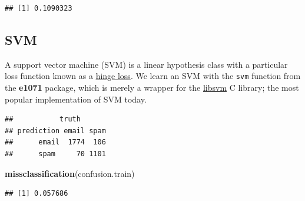 \documentclass[]{book}
\newenvironment{Shaded}{\begin{snugshade}}{\end{snugshade}}
\newcommand{\KeywordTok}[1]{\textcolor[rgb]{0.13,0.29,0.53}{\textbf{#1}}}
\newcommand{\DataTypeTok}[1]{\textcolor[rgb]{0.13,0.29,0.53}{#1}}
\newcommand{\DecValTok}[1]{\textcolor[rgb]{0.00,0.00,0.81}{#1}}
\newcommand{\StringTok}[1]{\textcolor[rgb]{0.31,0.60,0.02}{#1}}
\newcommand{\CommentTok}[1]{\textcolor[rgb]{0.56,0.35,0.01}{\textit{#1}}}
\newcommand{\OperatorTok}[1]{\textcolor[rgb]{0.81,0.36,0.00}{\textbf{#1}}}
\newcommand{\NormalTok}[1]{#1}
\theoremstyle{definition}
\theoremstyle{definition}
\theoremstyle{definition}
\theoremstyle{remark}
\begin{document}
\begin{verbatim}
## [1] 0.1090323
\end{verbatim}

\subsection{SVM}\label{svm}

A support vector machine (SVM) is a linear hypothesis class with a
particular loss function known as a
\href{https://en.wikipedia.org/wiki/Hinge_loss}{hinge loss}. We learn an
SVM with the \texttt{svm} function from the \textbf{e1071} package,
which is merely a wrapper for the
\href{https://www.csie.ntu.edu.tw/~cjlin/libsvm/}{libsvm} C library; the
most popular implementation of SVM today.

\begin{Shaded}
\end{Shaded}

\begin{verbatim}
##           truth
## prediction email spam
##      email  1774  106
##      spam     70 1101
\end{verbatim}

\begin{Shaded}
\begin{Highlighting}[]
\KeywordTok{missclassification}\NormalTok{(confusion.train)}
\end{Highlighting}
\end{Shaded}

\begin{verbatim}
## [1] 0.057686
\end{verbatim}

\begin{Shaded}
\end{Shaded}
\end{document}
